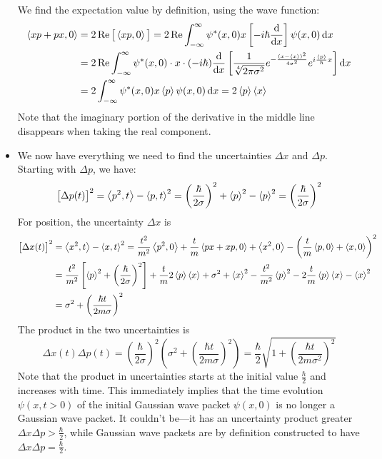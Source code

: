 \documentclass[11pt, a4paper]{article}
\newcommand{\diff}{\mathop{}\!\mathrm{d}} %
\begin{document}
\begin{itemize}
	We find the expectation value by definition, using the wave function:
	\begin{align*}
		\ev{xp + px, 0} &= 2\Re \big[\ev{xp, 0}\big] = 2\Re \int_{-\infty}^{\infty}\psi^{*}(x, 0)x\left[-i\hbar \dv{x}\right]\psi(x, 0) \diff x\\
		&= 2 \Re \int_{-\infty}^{\infty} \psi^{*}(x, 0) \cdot x \cdot (-i\hbar)\dv{x}\left[\frac{1}{\sqrt[4]{2\pi \sigma^{2}}}e^{-\frac{(x - \ev{x})^{2}}{4\sigma^{2}}}e^{i\frac{\ev{p}}{\hbar}x}\right]  \diff x\\
		&=2 \int_{-\infty}^{\infty} \psi^{*}(x, 0)x \ev{p} \psi(x, 0) \diff x = 2 \ev{p}\ev{x}
	\end{align*}
	Note that the imaginary portion of the derivative in the middle line disappears when taking the real component.
	
	\item We now have everything we need to find the uncertainties $ \Delta x $ and $ \Delta p $. Starting with $ \Delta p $, we have:
	\begin{equation*}
		\big[\Delta p(t)\big]^{2} = \ev{p^{2}, t} - \ev{p, t}^{2} =  \left(\frac{\hbar}{2\sigma}\right)^{2} + \ev{p}^{2} - \ev{p}^{2} = \left(\frac{\hbar}{2\sigma}\right)^{2}
	\end{equation*}
	For position, the uncertainty $ \Delta x $ is
	\begin{align*}
		\big[\Delta x(t)\big]^{2} &= \ev{x^{2}, t} - \ev{x, t}^{2} = \frac{t^{2}}{m^{2}}\ev{p^{2}, 0} + \frac{t}{m} \ev{px + xp, 0} + \ev{x^{2}, 0} - \left( \frac{t}{m} \ev{p, 0} + \ev{x, 0} \right)^{2}\\
		&=\frac{t^{2}}{m^{2}}\left[\ev{p}^{2} + \left(\frac{\hbar}{2\sigma}\right)^{2}\right] + \frac{t}{m}2\ev{p}\ev{x} + \sigma^{2} + \ev{x}^{2} - \frac{t^{2}}{m^{2}}\ev{p}^{2} - 2\frac{t}{m}\ev{p}\ev{x} - \ev{x}^{2}\\
		&= \sigma^{2} + \left(\frac{\hbar t}{2m\sigma}\right)^{2}
	\end{align*}
	The product in the two uncertainties is 
	\begin{equation*}
		\Delta x(t) \Delta p(t) = \left(\frac{\hbar}{2\sigma}\right)^{2}\left(\sigma^{2} + \left(\frac{\hbar t}{2m\sigma}\right)^{2}\right) = \frac{\hbar}{2}\sqrt{1 + \left(\frac{\hbar t}{2m\sigma^{2}}\right)^{2}}
	\end{equation*}
	Note that the product in uncertainties starts at the initial value $ \frac{\hbar}{2} $ and increases with time. This immediately implies that the time evolution $ \psi(x, t > 0) $ of the initial Gaussian wave packet $ \psi(x, 0) $ is no longer a Gaussian wave packet. It couldn't be---it has an uncertainty product greater $ \Delta x \Delta p > \frac{\hbar}{2} $, while Gaussian wave packets are by definition constructed to have $ \Delta x \Delta p = \frac{\hbar}{2} $. 
\end{itemize}
\end{document}
